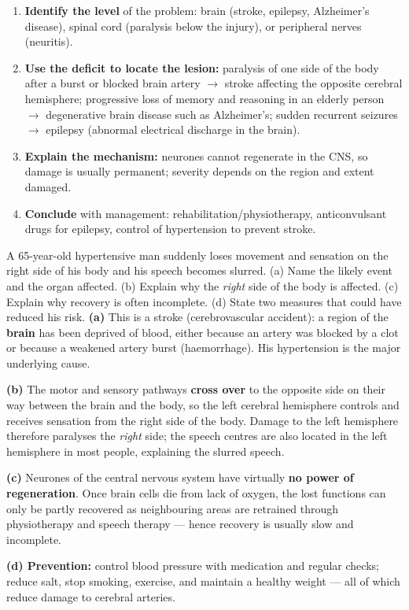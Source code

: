 \documentclass[11pt]{article}
\newcommand{\cle}[1]{{\popxbold\color{popdark}#1}}
\begin{document}
\begin{methode}
\begin{enumerate}
\item \textbf{Identify the level} of the problem: brain (stroke, epilepsy, Alzheimer's disease), spinal cord (paralysis below the injury), or peripheral nerves (neuritis).
\item \textbf{Use the deficit to locate the lesion:} paralysis of one side of the body after a burst or blocked brain artery $\rightarrow$ stroke affecting the opposite cerebral hemisphere; progressive loss of memory and reasoning in an elderly person $\rightarrow$ degenerative brain disease such as Alzheimer's; sudden recurrent seizures $\rightarrow$ epilepsy (abnormal electrical discharge in the brain).
\item \textbf{Explain the mechanism:} neurones cannot regenerate in the CNS, so damage is usually permanent; severity depends on the region and extent damaged.
\item \textbf{Conclude} with management: rehabilitation/physiotherapy, anticonvulsant drugs for epilepsy, control of hypertension to prevent stroke.
\end{enumerate}
\end{methode}

\begin{exoresolu}
A 65-year-old hypertensive man suddenly loses movement and sensation on the right side of his body and his speech becomes slurred. (a) Name the likely event and the organ affected. (b) Explain why the \emph{right} side of the body is affected. (c) Explain why recovery is often incomplete. (d) State two measures that could have reduced his risk.
\tcblower
\textbf{(a)} This is a \cle{stroke} (cerebrovascular accident): a region of the \textbf{brain} has been deprived of blood, either because an artery was blocked by a clot or because a weakened artery burst (haemorrhage). His hypertension is the major underlying cause.

\textbf{(b)} The motor and sensory pathways \textbf{cross over} to the opposite side on their way between the brain and the body, so the left cerebral hemisphere controls and receives sensation from the right side of the body. Damage to the left hemisphere therefore paralyses the \emph{right} side; the speech centres are also located in the left hemisphere in most people, explaining the slurred speech.

\textbf{(c)} Neurones of the central nervous system have virtually \textbf{no power of regeneration}. Once brain cells die from lack of oxygen, the lost functions can only be partly recovered as neighbouring areas are retrained through physiotherapy and speech therapy — hence recovery is usually slow and incomplete.

\textbf{(d) Prevention:} control blood pressure with medication and regular checks; reduce salt, stop smoking, exercise, and maintain a healthy weight — all of which reduce damage to cerebral arteries.
\end{exoresolu}
\end{document}

